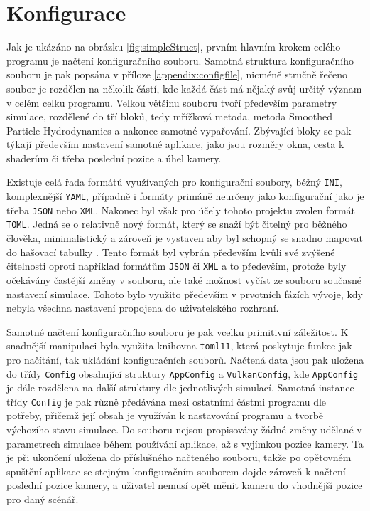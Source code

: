 \section{Konfigurace}
\label{chapter:konfigurace}
Jak je ukázáno na obrázku \ref{fig:simpleStruct}, prvním hlavním krokem celého programu je načtení konfiguračního souboru. Samotná struktura konfiguračního souboru je pak popsána v příloze \ref{appendix:configfile}, nicméně stručně řečeno soubor je rozdělen na několik částí, kde každá část má nějaký svůj určitý význam v celém celku programu. Velkou většinu souboru tvoří především parametry simulace, rozdělené do tří bloků, tedy mřížková metoda, metoda Smoothed Particle Hydrodynamics a nakonec samotné vypařování. Zbývající bloky se pak týkají především nastavení samotné aplikace, jako jsou rozměry okna, cesta k shaderům či třeba poslední pozice a úhel kamery.

Existuje celá řada formátů využívaných pro konfigurační soubory, běžný \texttt{INI}, komplexnější \texttt{YAML}, případně i formáty primáně neurčeny jako konfigurační jako je třeba \texttt{JSON} nebo \texttt{XML}. Nakonec byl však pro účely tohoto projektu zvolen formát \texttt{TOML}. Jedná se o relativně nový formát, který se snaží být čitelný pro běžného člověka, minimalistický a zároveň je vystaven aby byl schopný se snadno mapovat do hašovací tabulky \cite{toml-lang}. Tento formát byl vybrán především kvůli své zvýšené čitelnosti oproti například formátům \texttt{JSON} či \texttt{XML} a to především, protože byly očekávány častější změny v souboru, ale také možnost vyčíst ze souboru současné nastavení simulace. Tohoto bylo využito především v prvotních fázích vývoje, kdy nebyla všechna nastavení propojena do uživatelského rozhraní.

Samotné načtení konfiguračního souboru je pak vcelku primitivní záležitost. K snadnější manipulaci byla využita knihovna \texttt{toml11}, která poskytuje funkce jak pro načítání, tak ukládání konfiguračních souborů. Načtená data jsou pak uložena do třídy \texttt{Config} obsahující struktury \texttt{AppConfig} a \texttt{VulkanConfig}, kde \texttt{AppConfig} je dále rozdělena na další struktury dle jednotlivých simulací. Samotná instance třídy \texttt{Config} je pak různě předávána mezi ostatními částmi programu dle potřeby, přičemž její obsah je využíván k nastavování programu a tvorbě výchozího stavu simulace. Do souboru nejsou propisovány žádné změny udělané v parametrech simulace během používání aplikace, až s vyjímkou pozice kamery. Ta je při ukončení uložena do příslušného načteného souboru, takže po opětovném spuštění aplikace se stejným konfiguračním souborem dojde zároveň k načtení poslední pozice kamery, a uživatel nemusí opět měnit kameru do vhodnější pozice pro daný scénář.

